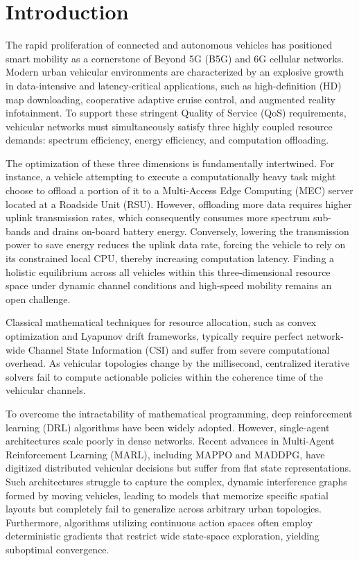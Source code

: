 \section{Introduction}
\label{sec:intro}

The rapid proliferation of connected and autonomous vehicles has positioned smart mobility as a cornerstone of Beyond 5G (B5G) and 6G cellular networks. Modern urban vehicular environments are characterized by an explosive growth in data-intensive and latency-critical applications, such as high-definition (HD) map downloading, cooperative adaptive cruise control, and augmented reality infotainment. To support these stringent Quality of Service (QoS) requirements, vehicular networks must simultaneously satisfy three highly coupled resource demands: spectrum efficiency, energy efficiency, and computation offloading.

The optimization of these three dimensions is fundamentally intertwined. For instance, a vehicle attempting to execute a computationally heavy task might choose to offload a portion of it to a Multi-Access Edge Computing (MEC) server located at a Roadside Unit (RSU). However, offloading more data requires higher uplink transmission rates, which consequently consumes more spectrum sub-bands and drains on-board battery energy. Conversely, lowering the transmission power to save energy reduces the uplink data rate, forcing the vehicle to rely on its constrained local CPU, thereby increasing computation latency. Finding a holistic equilibrium across all vehicles within this three-dimensional resource space under dynamic channel conditions and high-speed mobility remains an open challenge.

Classical mathematical techniques for resource allocation, such as convex optimization and Lyapunov drift frameworks, typically require perfect network-wide Channel State Information (CSI) and suffer from severe computational overhead. As vehicular topologies change by the millisecond, centralized iterative solvers fail to compute actionable policies within the coherence time of the vehicular channels.

To overcome the intractability of mathematical programming, deep reinforcement learning (DRL) algorithms have been widely adopted. However, single-agent architectures scale poorly in dense networks. Recent advances in Multi-Agent Reinforcement Learning (MARL), including MAPPO and MADDPG, have digitized distributed vehicular decisions but suffer from flat state representations. Such architectures struggle to capture the complex, dynamic interference graphs formed by moving vehicles, leading to models that memorize specific spatial layouts but completely fail to generalize across arbitrary urban topologies. Furthermore, algorithms utilizing continuous action spaces often employ deterministic gradients that restrict wide state-space exploration, yielding suboptimal convergence.


